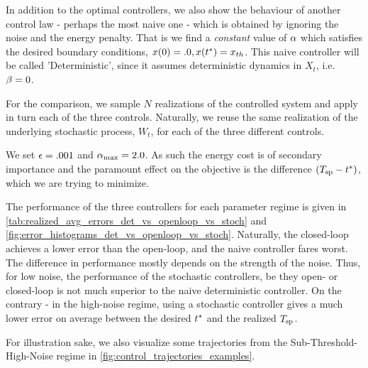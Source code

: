 \documentclass{article}
\begin{document}
In addition to the optimal controllers, we also show the behaviour of
another control law - perhaps the most naive one - which is obtained by ignoring
the noise and the energy penalty. That is we find a {\sl constant} value of ${\alpha}$
which satisfies the desired boundary conditions, $x(0) = .0, x({ t^* }) = { x_{th} }$. This naive
controller will be called 'Deterministic', since it assumes deterministic
dynamics in $X_t$, i.e.\ ${\beta} = 0$.

For the comparison, we sample $N$ realizations of the controlled system
and apply in turn each of the three controls. Naturally, we reuse the same
realization of the underlying stochastic process, $W_t$, for each of the
three different controls.

We set ${\epsilon} = .001$ and ${ {\alpha}_{\textrm{max}} } = 2.0$. As such the energy cost is of secondary
importance and the paramount effect on the objective is the difference $({ T_{\textrm{sp} } } -
{ t^* })$, which we are trying to minimize.

The performance of the three controllers for each parameter regime is given in
\cref{tab:realized_avg_errors_det_vs_openloop_vs_stoch} and  
\cref{fig:error_histograms_det_vs_openloop_vs_stoch}. Naturally, the closed-loop
achieves a lower error than the open-loop, and the naive controller fares worst.
The difference in performance mostly depends on the strength of the noise. Thus,
for low noise, the performance of the stochastic controllers, be they open- or
closed-loop is not much superior to the naive deterministic controller. On the
contrary - in the high-noise regime, using a stochastic controller gives a much
lower error on average between the desired ${ t^* }$ and the realized ${ T_{\textrm{sp} } }$.

For illustration sake, we also visualize some trajectories from the
Sub-Threshold-High-Noise regime in \cref{fig:control_trajectories_examples}.
\end{document}
